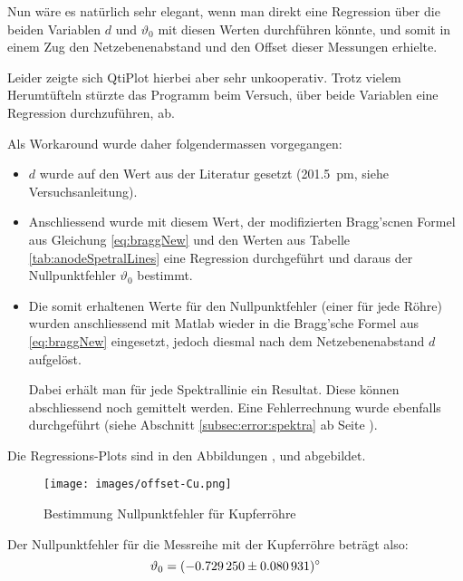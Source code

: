 Nun w\"are es nat\"urlich sehr elegant, wenn man direkt eine Regression \"uber
die  beiden Variablen  $d$ und  $\vartheta_0$ mit  diesen Werten  durchf\"uhren
k\"onnte, und somit  in einem Zug den Netzebenenabstand und  den Offset dieser
Messungen erhielte.

Leider  zeigte  sich  QtiPlot  hierbei aber  sehr  unkooperativ. Trotz  vielem
Herumt\"ufteln  st\"urzte das  Programm beim  Versuch, \"uber  beide Variablen
eine Regression durchzuf\"uhren, ab.

Als Workaround wurde daher folgendermassen vorgegangen:

\begin{itemize}
    \item
        $d$    wurde    auf   den    Wert    aus    der   Literatur    gesetzt
        (\SI{201.5}{\pico\meter}, siehe Versuchsanleitung).
    \item
        Anschliessend  wurde mit  diesem Wert,  der modifizierten  Bragg'scnen
        Formel  aus Gleichung  \ref{eq:braggNew}  und den  Werten aus  Tabelle
        \ref{tab:anodeSpetralLines} eine Regression  durchgef\"uhrt und daraus
        der Nullpunktfehler $\vartheta_0$ bestimmt.
    \item
        Die somit erhaltenen Werte f\"ur den Nullpunktfehler (einer f\"ur jede
        R\"ohre)  wurden anschliessend  mit  Matlab wieder  in die  Bragg'sche
        Formel  aus  \ref{eq:braggNew}  eingesetzt, jedoch  diesmal  nach  dem
        Netzebenenabstand $d$ aufgel\"ost.

        Dabei     erh\"alt     man     f\"ur    jede     Spektrallinie     ein
        Resultat. Diese  k\"onnen  abschliessend noch  gemittelt  werden. Eine
        Fehlerrechnung   wurde  ebenfalls   durchgef\"uhrt  (siehe   Abschnitt
        \ref{subsec:error:spektra} ab Seite \pageref{subsec:error:spektra}).
\end{itemize}

Die   Regressions-Plots  sind   in   den  Abbildungen   \label{fig:offset:cu},
\label{fig:offset:fe} und \label{fig:offset:mo} abgebildet.


\begin{figure}[h!]
    \centering
    \texttt{[image: images/offset-Cu.png]}
    \caption{Bestimmung Nullpunktfehler f\"ur Kupferr\"ohre}
    \label{fig:offset:cu}
\end{figure}
Der Nullpunktfehler f\"ur die Messreihe mit der Kupferr\"ohre betr\"agt also:
$$\vartheta_0 = \SI{-0.72925 \pm 0.080931}{\degree}$$

